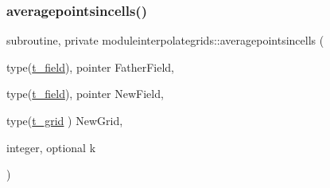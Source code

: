 \subsubsection{\texorpdfstring{averagepointsincells()}{averagepointsincells()}}
{\footnotesize\ttfamily subroutine, private moduleinterpolategrids\+::averagepointsincells (\begin{DoxyParamCaption}\item[{type(\mbox{\hyperlink{structmoduleinterpolategrids_1_1t__field}{t\+\_\+field}}), pointer}]{Father\+Field,  }\item[{type(\mbox{\hyperlink{structmoduleinterpolategrids_1_1t__field}{t\+\_\+field}}), pointer}]{New\+Field,  }\item[{type(\mbox{\hyperlink{structmoduleinterpolategrids_1_1t__grid}{t\+\_\+grid}} )}]{New\+Grid,  }\item[{integer, optional}]{k }\end{DoxyParamCaption})\hspace{0.3cm}{\ttfamily [private]}}

